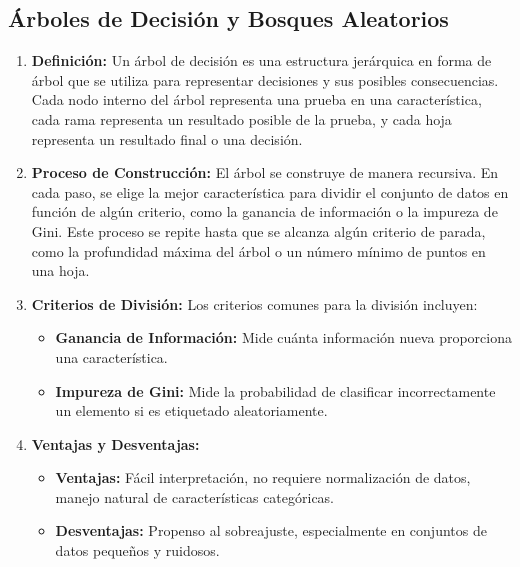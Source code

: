 \documentclass{book}
\begin{document}
\subsection{Árboles de Decisión y Bosques Aleatorios}
\begin{enumerate}
    \item \textbf{Definición:}
        Un árbol de decisión es una estructura jerárquica en forma de árbol que se utiliza para representar decisiones y sus posibles consecuencias. Cada nodo interno del árbol representa una prueba en una característica, cada rama representa un resultado posible de la prueba, y cada hoja representa un resultado final o una decisión.

    \item \textbf{Proceso de Construcción:}
        El árbol se construye de manera recursiva. En cada paso, se elige la mejor característica para dividir el conjunto de datos en función de algún criterio, como la ganancia de información o la impureza de Gini. Este proceso se repite hasta que se alcanza algún criterio de parada, como la profundidad máxima del árbol o un número mínimo de puntos en una hoja.

    \item \textbf{Criterios de División:}
        Los criterios comunes para la división incluyen:
        \begin{itemize}
            \item \textbf{Ganancia de Información:} Mide cuánta información nueva proporciona una característica.
            \item \textbf{Impureza de Gini:} Mide la probabilidad de clasificar incorrectamente un elemento si es etiquetado aleatoriamente.
        \end{itemize}

    \item \textbf{Ventajas y Desventajas:}
        \begin{itemize}
            \item \textbf{Ventajas:} Fácil interpretación, no requiere normalización de datos, manejo natural de características categóricas.
            \item \textbf{Desventajas:} Propenso al sobreajuste, especialmente en conjuntos de datos pequeños y ruidosos.
        \end{itemize}
\end{enumerate}
\end{document}
